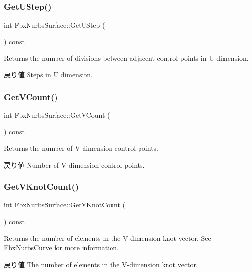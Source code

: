 \subsubsection{\texorpdfstring{Get\+U\+Step()}{GetUStep()}}
{\footnotesize\ttfamily int Fbx\+Nurbs\+Surface\+::\+Get\+U\+Step (\begin{DoxyParamCaption}{ }\end{DoxyParamCaption}) const}

Returns the number of divisions between adjacent control points in U dimension. \begin{DoxyReturn}{戻り値}
Steps in U dimension. 
\end{DoxyReturn}
\mbox{\label{class_fbx_nurbs_surface_a019ea2ce9a16d0f4a626209da05f52a3}} 
\subsubsection{\texorpdfstring{Get\+V\+Count()}{GetVCount()}}
{\footnotesize\ttfamily int Fbx\+Nurbs\+Surface\+::\+Get\+V\+Count (\begin{DoxyParamCaption}{ }\end{DoxyParamCaption}) const}

Returns the number of V-\/dimension control points. \begin{DoxyReturn}{戻り値}
Number of V-\/dimension control points. 
\end{DoxyReturn}
\mbox{\label{class_fbx_nurbs_surface_aa1776426c0e8b230c302d9c90b0244f9}} 
\subsubsection{\texorpdfstring{Get\+V\+Knot\+Count()}{GetVKnotCount()}}
{\footnotesize\ttfamily int Fbx\+Nurbs\+Surface\+::\+Get\+V\+Knot\+Count (\begin{DoxyParamCaption}{ }\end{DoxyParamCaption}) const}

Returns the number of elements in the V-\/dimension knot vector. See \hyperlink{class_fbx_nurbs_curve}{Fbx\+Nurbs\+Curve} for more information. \begin{DoxyReturn}{戻り値}
The number of elements in the V-\/dimension knot vector. 
\end{DoxyReturn}
\mbox{\label{class_fbx_nurbs_surface_ac12a9bb5194931ba8be016dd0d309e9f}} 
